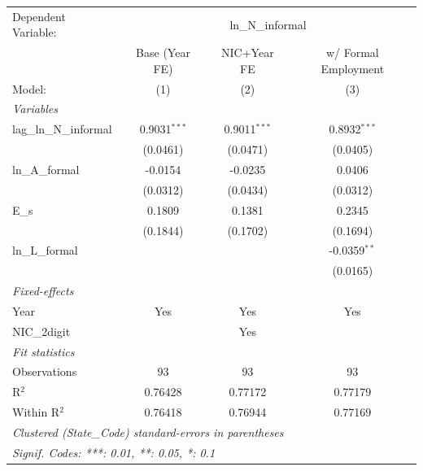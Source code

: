 
\begingroup
\centering
\begin{tabular}{lccc}
   \tabularnewline \midrule \midrule
   Dependent Variable: & \multicolumn{3}{c}{ln\_N\_informal}\\
                           & Base (Year FE) & NIC+Year FE    & w/ Formal Employment \\   
   Model:                  & (1)            & (2)            & (3)\\  
   \midrule
   \emph{Variables}\\
   lag\_ln\_N\_informal    & 0.9031$^{***}$ & 0.9011$^{***}$ & 0.8932$^{***}$\\   
                           & (0.0461)       & (0.0471)       & (0.0405)\\   
   ln\_A\_formal           & -0.0154        & -0.0235        & 0.0406\\   
                           & (0.0312)       & (0.0434)       & (0.0312)\\   
   E\_s                    & 0.1809         & 0.1381         & 0.2345\\   
                           & (0.1844)       & (0.1702)       & (0.1694)\\   
   ln\_L\_formal           &                &                & -0.0359$^{**}$\\   
                           &                &                & (0.0165)\\   
   \midrule
   \emph{Fixed-effects}\\
   Year                    & Yes            & Yes            & Yes\\  
   NIC\_2digit             &                & Yes            & \\  
   \midrule
   \emph{Fit statistics}\\
   Observations            & 93             & 93             & 93\\  
   R$^2$                   & 0.76428        & 0.77172        & 0.77179\\  
   Within R$^2$            & 0.76418        & 0.76944        & 0.77169\\  
   \midrule \midrule
   \multicolumn{4}{l}{\emph{Clustered (State\_Code) standard-errors in parentheses}}\\
   \multicolumn{4}{l}{\emph{Signif. Codes: ***: 0.01, **: 0.05, *: 0.1}}\\
\end{tabular}
\par\endgroup


